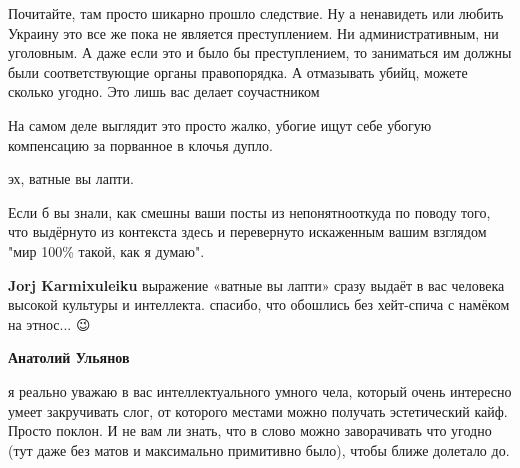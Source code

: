\begin{itemize}
\begin{itemize}
Почитайте, там просто шикарно прошло следствие. Ну а ненавидеть или любить
Украину это все же пока не является преступлением. Ни административным, ни
уголовным. А даже если это и было бы преступлением, то заниматься им должны
были соответствующие органы правопорядка. А отмазывать убийц, можете сколько
угодно. Это лишь вас делает соучастником
\end{itemize}

 
На самом деле выглядит это просто жалко, убогие ищут себе убогую компенсацию за порванное в клочья дупло.

 

эх, ватные вы лапти.

Если б вы знали, как смешны ваши посты из непонятнооткуда по поводу того, что
выдёрнуто из контекста здесь и перевернуто искаженным вашим взглядом "мир 100\%
такой, как я думаю".

\begin{itemize}
 
\textbf{Jorj Karmixuleiku} выражение «ватные вы лапти» сразу выдаёт в вас
человека высокой культуры и интеллекта. спасибо, что обошлись без хейт-спича с
намёком на этнос... 😉

 
\textbf{Анатолий Ульянов} 

я реально уважаю в вас интеллектуального умного чела, который очень интересно
умеет закручивать слог, от которого местами можно получать эстетический кайф.
Просто поклон. И не вам ли знать, что в слово можно заворачивать что угодно
(тут даже без матов и максимально примитивно было), чтобы ближе долетало до.


\end{itemize}
\end{itemize}
